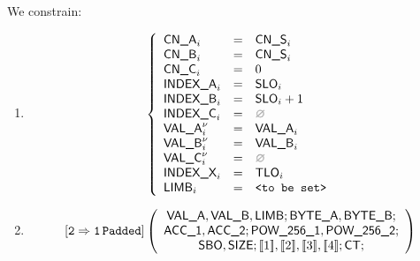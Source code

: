 \begin{center}
\end{center}

We constrain:
\begin{enumerate}
	\item 
\[
	\left\{
	\begin{array}{lclr}
		\cnA      _{i}       & = & \cnS_{i}      \\
		\cnB      _{i}       & = & \cnS_{i}      \\
		\cnC      _{i}       & = & 0             \\
		\indexA   _{i}       & = & \slo_{i}      \\
		\indexB   _{i}       & = & \slo_{i}+1    \\
		\indexC   _{i}       & = & \nothing      \\
		\valA     _{i}\new{} & = & \valA_{i}     \\
		\valB     _{i}\new{} & = & \valB_{i}     \\
		\valC     _{i}\new{} & = & \nothing      \\
		\indexX   _{i}       & = & \tlo_{i}      \\
		\limb     _{i}       & = & \valueToBeSet \\
	\end{array}
	\right.
\]
	\item 
\[
	\twoToOnePadded
	\left(
	\begin{array}{c}
	\valA{}, \valB{}, \limb{}; \BYTEA{}, \BYTEB{};\\
	\acc{1}, \acc{2}; \pow{1}, \pow{2};\\
	\sbo{}, \size{}; \bit{1}, \bit{2}, \bit{3}, \bit{4}; \ct{};
	\end{array}
	\right)
\]
\end{enumerate}






